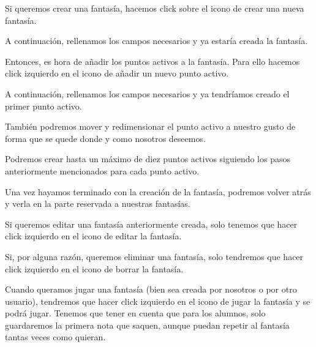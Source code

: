 Si queremos crear una fantasía, hacemos click sobre el icono de crear una nueva fantasía.

A continuación, rellenamos los campos necesarios y ya estaría creada la fantasía.

Entonces, es hora de añadir los puntos activos a la fantasía. Para ello hacemos click izquierdo en el icono de añadir un nuevo punto activo.

A continuación, rellenamos los campos necesarios y ya tendríamos creado el primer punto activo.

También podremos mover y redimensionar el punto activo a nuestro gusto de forma que se quede donde y como nosotros deseemos.

Podremos crear hasta un máximo de diez puntos activos siguiendo los pasos anteriormente mencionados para cada punto activo.

Una vez hayamos terminado con la creación de la fantasía, podremos volver atrás y verla en la parte reservada a nuestras fantasías.

Si queremos editar una fantasía anteriormente creada, solo tenemos que hacer click izquierdo en el icono de editar la fantasía.

Si, por alguna razón, queremos eliminar una fantasía, solo tendremos que hacer click izquierdo en el icono de borrar la fantasía.

Cuando queramos jugar una fantasía (bien sea creada por nosotros o por otro usuario), tendremos que hacer click izquierdo en el icono de jugar la fantasía y se podrá jugar. Tenemos que tener en cuenta que para los alumnos, solo guardaremos la primera nota que saquen, aunque puedan repetir al fantasía tantas veces como quieran.